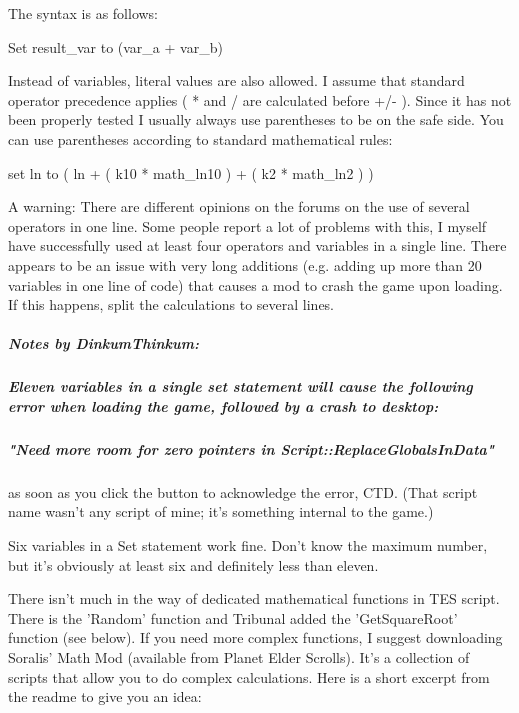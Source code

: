 \documentclass[
]{article}
\begin{document}
The syntax is as follows:

Set result\_var to (var\_a + var\_b)

Instead of variables, literal values are also allowed. I assume that
standard operator precedence applies ( * and / are calculated before +/-
). Since it has not been properly tested I usually always use
parentheses to be on the safe side. You can use parentheses according to
standard mathematical rules:

set ln to ( ln + ( k10 * math\_ln10 ) + ( k2 * math\_ln2 ) )

A warning: There are different opinions on the forums on the use of
several operators in one line. Some people report a lot of problems with
this, I myself have successfully used at least four operators and
variables in a single line. There appears to be an issue with very long
additions (e.g. adding up more than 20 variables in one line of code)
that causes a mod to crash the game upon loading. If this happens, split
the calculations to several lines.

\hypertarget{notes-by-dinkumthinkum}{%
\subparagraph{Notes by DinkumThinkum:}\label{notes-by-dinkumthinkum}}

\hypertarget{eleven-variables-in-a-single-set-statement-will-cause-the-following-error-when-loading-the-game-followed-by-a-crash-to-desktop}{%
\subparagraph{\texorpdfstring{\emph{Eleven variables in a single set
statement will cause the following error when loading the game, followed
by a crash to
desktop:}}{Eleven variables in a single set statement will cause the following error when loading the game, followed by a crash to desktop:}}\label{eleven-variables-in-a-single-set-statement-will-cause-the-following-error-when-loading-the-game-followed-by-a-crash-to-desktop}}

\hypertarget{need-more-room-for-zero-pointers-in-scriptreplaceglobalsindata}{%
\subparagraph{"Need more room for zero pointers in
Script::ReplaceGlobalsInData"}\label{need-more-room-for-zero-pointers-in-scriptreplaceglobalsindata}}

as soon as you click the button to acknowledge the error, CTD. (That
script name wasn't any script of mine; it's something internal to the
game.)

Six variables in a Set statement work fine. Don't know the maximum
number, but it's obviously at least six and definitely less than eleven.

There isn't much in the way of dedicated mathematical functions in TES
script. There is the 'Random' function and Tribunal added the
'GetSquareRoot' function (see below). If you need more complex
functions, I suggest downloading Soralis' Math Mod (available from
Planet Elder Scrolls). It's a collection of scripts that allow you to do
complex calculations. Here is a short excerpt from the readme to give
you an idea:
\end{document}
